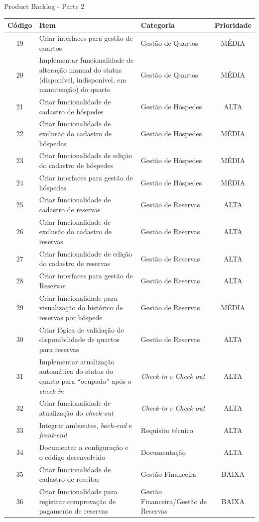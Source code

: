 \documentclass[
	12pt,				%
	openany,			%
	twoside,			%
	a4paper,			%
	english,			%
	french,				%
	spanish,			%
	brazil				%
	]{abntex2}
\begin{document}
%
\begin{quadro}[H]
	\caption{Product Backlog - Parte 2}
	\label{product_backlog_2}
	\begin{tabular}{|c|p{6.5cm}|p{3.8cm}|c|}
		\hline
		\textbf{Código} & \textbf{Item} & \textbf{Categoria} & \textbf{Prioridade} \\	\hline	
		19 & Criar interfaces para gestão de quartos & Gestão de Quartos & MÉDIA \\ \hline
		20 & Implementar funcionalidade de alteração manual do status (disponível, indisponível, em manutenção) do quarto & Gestão de Quartos & MÉDIA \\ \hline
		21 & Criar funcionalidade de cadastro de hóspedes &	Gestão de Hóspedes & ALTA \\ \hline
		22 & Criar funcionalidade de exclusão do cadastro de hóspedes &
		Gestão de Hóspedes & MÉDIA \\
		23 & Criar funcionalidade de edição do cadastro de hóspedes &
		Gestão de Hóspedes & MÉDIA \\ \hline
		24 & Criar interfaces para gestão de hóspedes &	Gestão de Hóspedes & MÉDIA \\ \hline
		25 & Criar funcionalidade de cadastro de reservas &	Gestão de Reservas & ALTA \\ \hline
		26 & Criar funcionalidade de exclusão do cadastro de reservas &
		Gestão de Reservas & ALTA \\ \hline
		27 & Criar funcionalidade de edição do cadastro de reservas &
		Gestão de Reservas & ALTA \\ \hline
		28 & Criar interfaces para gestão de Reservas &	Gestão de Reservas & ALTA \\ \hline
		29 & Criar funcionalidade para visualização do histórico de reservas por hóspede & Gestão de Reservas &	MÉDIA \\ \hline
		30 & Criar lógica de validação de disponibilidade de quartos para reservas & Gestão de Reservas & ALTA \\ \hline
		31 & Implementar atualização automática do status do quarto para “ocupado” após o \textit {check-in} & \textit {Check-in} e \textit {Check-out} & ALTA 
		\\ \hline
		32 & Criar funcionalidade de atualização do \textit {check-out} &
		\textit {Check-in} e \textit {Check-out} &	ALTA \\ \hline
		33 & Integrar ambientes, \textit{back-end} e \textit {front-end} &	Requisito técnico & ALTA \\ \hline
		34 & Documentar a configuração e o código desenvolvido &
		Documentação & ALTA \\ \hline
		35 & Criar funcionalidade de cadastro de receitas &	Gestão Financeira & BAIXA \\ \hline
		36 & Criar funcionalidade para registrar comprovação de pagamento de reservas &	Gestão Financeira/Gestão de Reservas &
		BAIXA \\ \hline
	\end{tabular}
     \end{quadro}
\end{document}
